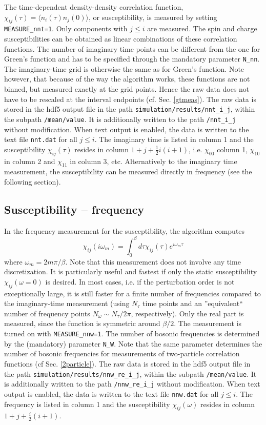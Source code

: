\documentclass[aps,prb,floatfix,superscriptaddress,twocolumn,notitlepage]{revtex4-1}
\begin{document}
The time-dependent density-density correlation function, $\chi_{ij}(\tau)=\langle n_{i}(\tau)n_{j}(0)\rangle$, or susceptibility, is measured by setting \verb#MEASURE_nnt=1#. Only components with $j\leq i$ are measured. The spin and charge susceptibilities can be obtained as linear combinations of these correlation functions.
The number of imaginary time points can be different from the one for Green's function and has to be specified through the mandatory parameter \verb#N_nn#. The imaginary-time grid is otherwise the same as for Green's function. Note however, that because of the way the algorithm works, these functions are not binned, but measured exactly at the grid points. Hence the raw data does not have to be rescaled at the interval endpoints (cf. Sec. \ref{gtmeas}).
The raw data is stored in the hdf5 output file in the path \verb#simulation/results/nnt_i_j#, within the subpath \verb#/mean/value#. It is additionally written to the path \verb#/nnt_i_j# without modification.
When text output is enabled, the data is written to the text file \verb|nnt.dat| for all $j\leq i$. The imaginary time is listed in column 1 and the susceptibility $\chi_{ij}(\tau)$ resides in column $1+j+\frac{1}{2}i(i+1)$, i.e. $\chi_{00}$ column 1, $\chi_{10}$ in column 2 and $\chi_{11}$ in column 3, etc.
Alternatively to the imaginary time measurement, the susceptibility can be measured directly in frequency (see the following section).

\subsection{Susceptibility -- frequency}
In the frequency measurement for the susceptibility, the algorithm computes
\begin{equation}
\chi_{ij}(i\omega_{m}) = \int_{0}^{\beta} d\tau \chi_{ij}(\tau) e^{i\omega_{m}\tau}
\end{equation}
where $\omega_{m}=2m\pi/\beta$. Note that this measurement does not involve any time discretization. It is particularly useful and fastest if only the static susceptibility $\chi_{ij}(\omega=0)$ is desired.
In most cases, i.e. if the perturbation order is not exceptionally large, it is still faster for a finite number of frequencies compared to the imaginary-time measurement (using $N_{\tau}$ time points and an ''equivalent`` number of frequency points $N_{\omega}\sim N_{\tau}/2\pi$, respectively).
Only the real part is measured, since the function is symmetric around $\beta/2$.
The measurement is turned on with \verb#MEASURE_nnw=1#. The number of bosonic frequencies is determined by the (mandatory) parameter \verb#N_W#. Note that the same parameter determines the number of bosonic frequencies for measurements of two-particle correlation functions (cf Sec. \ref{2particle}).
The raw data is stored in the hdf5 output file in the path \verb#simulation/results/nnw_re_i_j#, within the subpath \verb#/mean/value#. It is additionally written to the path \verb#/nnw_re_i_j# without modification.
When text output is enabled, the data is written to the text file \verb|nnw.dat| for all $j\leq i$. The frequency is listed in column 1 and the susceptibility $\chi_{ij}(\omega)$ resides in column $1+j+\frac{i}{2}(i+1)$.
\end{document}
